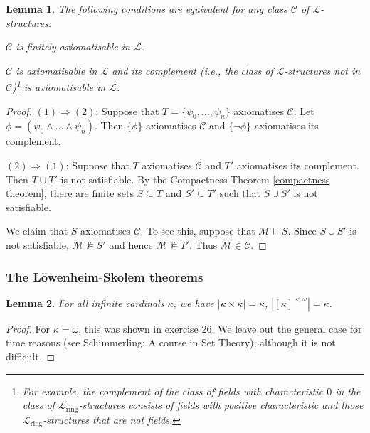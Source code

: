 \documentclass[a4paper, 11pt]{amsart}
\newtheorem{lemma}[lemma]{Lemma}
\theoremstyle{remark}
\newcommand{\cL}{\mathcal L}
\newcommand{\cM}{\mathcal M}
\newcommand{\cC}{\mathcal C}
\newenvironment{enumerate-(1)}{\begin{enumerate}[label={\upshape (\arabic*)}, leftmargin=2pc]}{\end{enumerate}}
\begin{document}
\begin{lemma} 
The following conditions are equivalent for any  class $\cC$ of $\cL$-structures: 
\begin{enumerate-(1)} 
\item 
$\cC$ is finitely axiomatisable in $\cL$. 
\item 
$\cC$ is axiomatisable in $\cL$ and its complement (i.e., the class of $\cL$-structures not in $\cC$)\footnote{For example, the complement of the class of fields with characteristic $0$ in the class of $\cL_{\mathrm{ring}}$-structures consists of fields with positive characteristic and those $\cL_{\mathrm{ring}}$-structures that are not fields.} 
 is axiomatisable in $\cL$. 
\end{enumerate-(1)} 
\end{lemma} 
\begin{proof} 
$ (1) \Rightarrow (2) $: 
Suppose that $T=\{\psi_0,\dots, \psi_n\}$ axiomatises $\cC$. 
Let $\phi= (\psi_0 \wedge \dots \wedge \psi_n)$. 
Then $\{\phi\}$ axiomatises $\cC$ and $\{\neg \phi\}$ axiomatises its complement. 

$ (2) \Rightarrow (1) $: 
Suppose that $T$ axiomatises $\cC$ and $T'$ axiomatises its complement.  
Then $T\cup T'$ is not satisfiable. 
By the Compactness Theorem \ref{compactness theorem}, there are finite sets $S\subseteq T$ and $S'\subseteq T'$ such that $S \cup S'$ is not satisfiable. 

We claim that $S$ axiomatises $\cC$. 
To see this, suppose that $\cM\models S$. 
Since $S\cup S'$ is not satisfiable, $\cM \not\models S'$ and hence $\cM\not \models T'$. 
Thus $\cM \in \cC$. 
\end{proof} 





\subsubsection{The L\"owenheim-Skolem theorems} 

\begin{lemma} 
\label{cardinal multiplication} 
For all infinite cardinals $\kappa$, we have $|\kappa\times \kappa|=\kappa$, $|[\kappa]^{<\omega}|=\kappa$. 
\end{lemma} 
\begin{proof} 
For $\kappa=\omega$, 
this was shown in exercise 26. 
We leave out the general case for time reasons (see Schimmerling: A course in Set Theory), although it is not difficult. 
\end{proof} 
\end{document}
